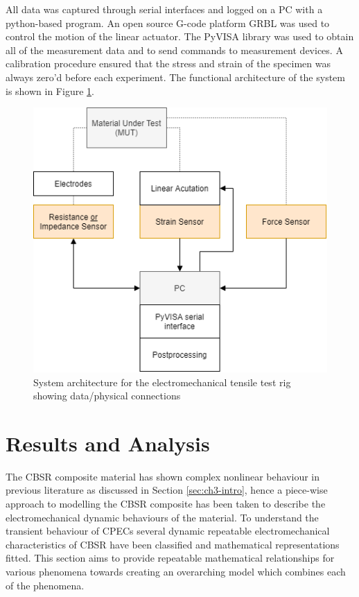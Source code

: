 All data was captured through serial interfaces and logged on a PC with a python-based program. An open source G-code platform GRBL was used to control the motion of the linear actuator. The PyVISA library was used to obtain all of the measurement data and to send commands to measurement devices. A calibration procedure ensured that the stress and strain of the specimen was always zero'd before each experiment. The functional architecture of the system is shown in Figure \ref{fig:electromech-architecture}.
\begin{figure}[H]
	\centering
	\includegraphics[width=0.65\linewidth]{Figures/Electromech_tester.png}
	\caption{System architecture for the electromechanical tensile test rig showing data/physical connections}
	\label{fig:electromech-architecture}
\end{figure}


\section{Results and Analysis}
The CBSR composite material has shown complex nonlinear behaviour in previous literature as discussed in Section \ref{sec:ch3-intro}, hence a piece-wise approach to modelling the CBSR composite has been taken to describe the electromechanical dynamic behaviours of the material. To understand the transient behaviour of CPECs several dynamic repeatable electromechanical characteristics of CBSR have been classified and mathematical representations fitted. This section aims to provide repeatable mathematical relationships for various phenomena towards creating an overarching model which combines each of the phenomena.


